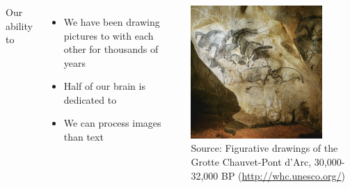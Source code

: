 \documentclass[8pt]{beamer}
\begin{document}

\begin{frame}
\frametitle{\insertsection}

\begin{columns}[c]
Our ability to {\color{blue}{process images}}
	\begin{itemize}
		\item We have been drawing pictures to {\color{blue}{comunicate}} with each other for thousands of years
		\item Half of our brain is dedicated to {\color{blue}{processing visual signals}}
		\item We can process images {\color{blue}{60,000 times faster}} than text
	\end{itemize}


\centering
\includegraphics[width=5cm]{pont}\\
\tiny{Source: Figurative drawings of the Grotte Chauvet-Pont d’Arc, 30,000-32,000 BP (\url{http://whc.unesco.org/})}
\end{columns}

\end{frame}

\end{document}
